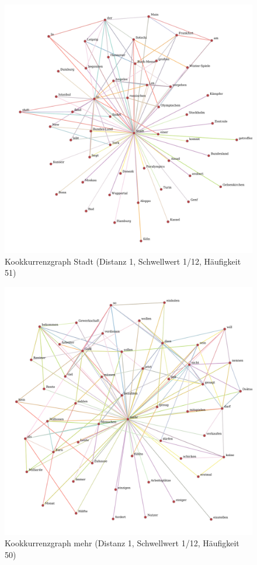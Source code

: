 \documentclass[11pt, a4paper]{article}
\begin{document}
\begin{figure}[hp!]
    \centering
        \includegraphics[scale=.4]{../../data/results/cooc_nl/topwords/graph_Stadt.pdf}
    \caption{Kookkurrenzgraph Stadt (Distanz 1, Schwellwert 1/12, Häufigkeit 51)}
    \label{fig:hw-stadt}
\end{figure}

\begin{figure}[hp!]
    \centering
        \includegraphics[scale=.4]{../../data/results/cooc_nl/topwords/graph_mehr.pdf}
    \caption{Kookkurrenzgraph mehr (Distanz 1, Schwellwert 1/12, Häufigkeit 50)}
    \label{fig:hw-mehr}
\end{figure}
\end{document}
